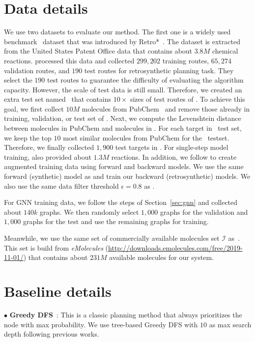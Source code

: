 \documentclass[sigconf]{acmart}
\begin{document}
\appendix
\section{Data details}
We use two datasets to evaluate our method. The first one is a widely used benchmark \uspto~dataset that was introduced by Retro*~\citep{Chen2020}. The dataset is extracted from the United States Patent Office data that contains about $3.8M$ chemical reactions.
\citet{Chen2020} processed this data and collected $299,202$ training routes, $65,274$ validation routes, and $190$ test routes for retrosynthetic planning task.
They select the $190$ test routes to guarantee the difficulty of evaluating the algorithm capacity.
However, the scale of test data is still small.
Therefore, we created an extra test set named \usptoext~that contains $10 \times$ sizes of test routes of \uspto.
To achieve this goal, we first collect $10M$ molecules from PubChem~\citep{pubchem} and remove those already in training, validation, or test set of \uspto.
Next, we compute the Levenshtein distance~\citep{levenshtein1966binary} between molecules in PubChem and molecules in \uspto.
For each target in \uspto~test set, we keep the top $10$ most similar molecules from PubChem for the \usptoext~testset.
Therefore, we finally collected $1,900$ test targets in \usptoext.
For single-step model training, \citet{Chen2020} also provided about $1.3M$ reactions.
In addition, we follow \citep{Kim2021} to create augmented training data using forward and backward models.
We use the same forward (synthetic) model as \citet{Kim2021} and train our backward (retrosynthetic) models. 
We also use the same data filter threshold $\epsilon = 0.8$ as \citet{Kim2021}.

For GNN training data, we follow the steps of Section~\ref{sec:gnn} and collected about $140k$ graphs.
We then randomly select $1,000$ graphs for the validation and $1,000$ graphs for the test and use the remaining graphs for training.

Meanwhile, we use the same set of commercially available molecules set $\mathcal{I}$ as~\cite{Chen2020,Kim2021}.
This set is build from \textit{eMolecules} (\url{http://downloads.emolecules.com/free/2019-11-01/}) that contains about $231M$ available molecules for our system.

\section{Baseline details}
$\bullet$ \textbf{Greedy DFS}~\citep{Hong2021}: This is a classic planning method that always prioritizes the node with max probability. We use tree-based Greedy DFS with $10$ as max search depth following previous works.
\end{document}

